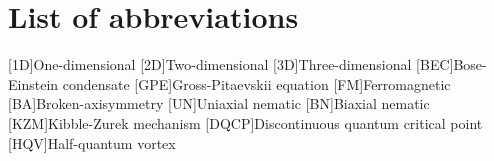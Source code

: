 \chapter*{List of abbreviations}
\begin{acronym}
    [1D]{One-dimensional}
    [2D]{Two-dimensional}
    [3D]{Three-dimensional}
    [BEC]{Bose-Einstein condensate}
    [GPE]{Gross-Pitaevskii equation}
    [FM]{Ferromagnetic}
    [BA]{Broken-axisymmetry}
    [UN]{Uniaxial nematic}
    [BN]{Biaxial nematic}
    [KZM]{Kibble-Zurek mechanism}
    [DQCP]{Discontinuous quantum critical point}
    [HQV]{Half-quantum vortex}
\end{acronym}